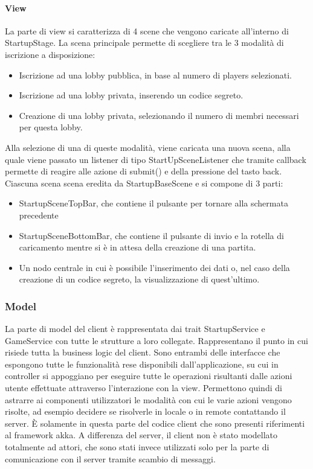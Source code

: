 \paragraph{View}
La parte di view si caratterizza di 4 scene che vengono caricate all’interno di StartupStage.
La scena principale permette di scegliere tra le 3 modalità di iscrizione a disposizione:
\begin{itemize}
    \item Iscrizione ad una lobby pubblica, in base al numero di players selezionati.
    \item Iscrizione ad una lobby privata, inserendo un codice segreto.
    \item Creazione di una lobby privata, selezionando il numero di membri necessari per questa lobby.
\end{itemize}
Alla selezione di una di queste modalità, viene caricata una nuova scena, alla quale viene passato un listener di tipo StartUpSceneListener che tramite callback permette di reagire alle azione di submit() e della pressione del tasto back.
\newline
Ciascuna scena scena eredita da StartupBaseScene e si compone di 3 parti:
\begin{itemize}
    \item StartupSceneTopBar, che contiene il pulsante per tornare alla schermata precedente
    \item StartupSceneBottomBar, che contiene il pulsante di invio e la rotella di caricamento mentre si è in attesa della creazione di una partita.
    \item Un nodo centrale in cui è possibile l’inserimento dei dati o, nel caso della creazione di un codice segreto, la visualizzazione di quest’ultimo.
\end{itemize}

\subsubsection{Model}
La parte di model del client è rappresentata dai trait StartupService e GameService con tutte le strutture a loro collegate.
Rappresentano il punto in cui risiede tutta la business logic del client.
Sono entrambi delle interfacce che espongono tutte le funzionalità rese disponibili dall’applicazione, su cui in controller si appoggiano per eseguire tutte le operazioni risultanti dalle azioni utente effettuate attraverso l’interazione con la view.
Permettono quindi di astrarre ai componenti utilizzatori le modalità con cui le varie azioni vengono risolte, ad esempio decidere se risolverle in locale o in remote contattando il server.
È solamente in questa parte del codice client che sono presenti riferimenti al framework akka.
A differenza del server, il client non è stato modellato totalmente ad attori, che sono stati invece utilizzati solo per la parte di comunicazione con il server tramite scambio di messaggi.

